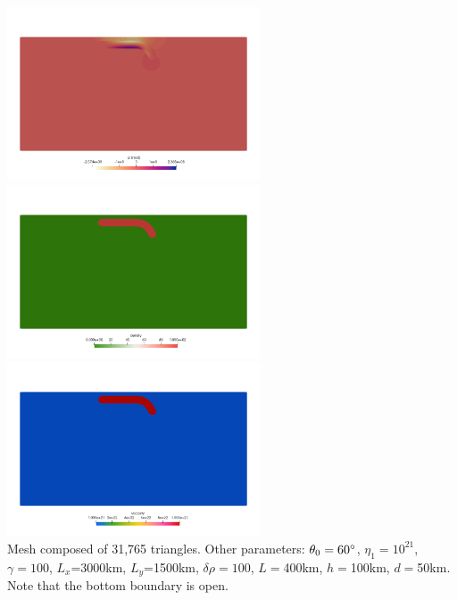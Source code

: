 \begin{center}
\includegraphics[width=7.5cm]{python_codes/fieldstone_55/images/press}\\
\includegraphics[width=7.5cm]{python_codes/fieldstone_55/images/rho}
\includegraphics[width=7.5cm]{python_codes/fieldstone_55/images/eta}\\
{\captionfont Mesh composed of 31,765 triangles.
Other parameters: $\theta_0=60\degree$, $\eta_1=10^{21}$, $\gamma=100$, 
$L_x$=3000km, $L_y$=1500km, $\delta\rho=100$, $L=$400km, $h=$100km, $d=$50km. 
Note that the bottom boundary is open.}
\end{center}



